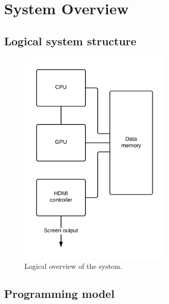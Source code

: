 \chapter{System Overview}

\section{Logical system structure}
\begin{figure}[H]
	\centering
	\includegraphics[width=0.65\textwidth]{system_overview/diagrams/logical_overview.png}
	\caption{Logical overview of the system.}
	\label{fig:logical_overview}
\end{figure}



\section{Programming model}

